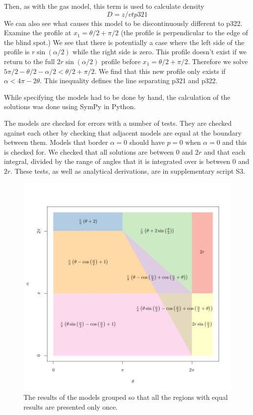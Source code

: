 \documentclass[a4paper,10pt,reqno,oneside]{amsart}
\begin{document}
Then, as with the gas model, this term is used to calculate density
\begin{equation}
D = z/vtp321
\end{equation}
We can also see what causes this model to be discontinuously different to p322. Examine the profile at $x_1 = 	\theta/2 + \pi/2$ (the profile is perpendicular to the edge of the blind spot.) We see that there is potentially a case where the left side of the profile is $r\sin( \alpha/2)$ while the right side is zero. This profile doesn't exist if we return to the full $2r\sin( \alpha/2)$ profile before $x_1  = \theta/2 + \pi/2$. Therefore we solve $5\pi/2 - \theta/2 - \alpha/2 <  \theta/2 + \pi/2$. We find that this new profile only exists if $ \alpha < 4\pi - 2 \theta$. This inequality defines the line separating p321 and p322.

While specifying the models had to be done by hand, the calculation of the solutions was done using SymPy \citep{sympy} in Python. 

The models are checked for errors with a number of tests. They are checked against each other by checking that adjacent models are equal at the boundary between them. Models that border $ \alpha = 0$ should have $p = 0$ when $ \alpha = 0$ and this is checked for. We checked that all solutions are between 0 and $2r$ and that each integral, divided by the range of angles that it is integrated over is between 0 and $2r$. These tests, as well as analytical derivations, are in supplementary script S3.


\begin{figure}
\centering
\includegraphics[width=1\textwidth]{imgs/equalModelResults.pdf}
\caption{The results of the models grouped so that all the regions with equal results are presented only once.}
\label{f:equalModelResults}
\end{figure}
\end{document}
